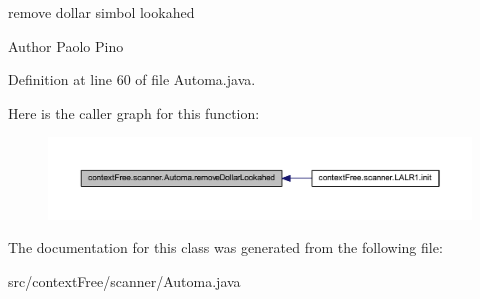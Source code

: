 remove dollar simbol lookahed 

\begin{DoxyAuthor}{Author}
Paolo Pino 
\end{DoxyAuthor}


Definition at line 60 of file Automa.\-java.



Here is the caller graph for this function\-:\nopagebreak
\begin{figure}[H]
\begin{center}
\leavevmode
\includegraphics[width=350pt]{classcontext_free_1_1scanner_1_1_automa_aae82c530ffa9a9ea010de9eb9f77707d_icgraph}
\end{center}
\end{figure}




The documentation for this class was generated from the following file\-:\begin{DoxyCompactItemize}
\item 
src/context\-Free/scanner/Automa.\-java\end{DoxyCompactItemize}

